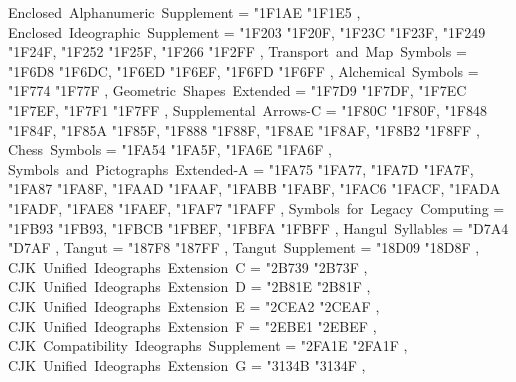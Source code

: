 {    Enclosed~Alphanumeric~Supplement               = { {"1F1AE} {"1F1E5} },
    Enclosed~Ideographic~Supplement                = { {"1F203} {"1F20F}, {"1F23C} {"1F23F}, {"1F249} {"1F24F}, {"1F252} {"1F25F}, {"1F266} {"1F2FF} },
    Transport~and~Map~Symbols                      = { {"1F6D8} {"1F6DC}, {"1F6ED} {"1F6EF}, {"1F6FD} {"1F6FF} },
    Alchemical~Symbols                             = { {"1F774} {"1F77F} },
    Geometric~Shapes~Extended                      = { {"1F7D9} {"1F7DF}, {"1F7EC} {"1F7EF}, {"1F7F1} {"1F7FF} },
    Supplemental~Arrows-C                          = { {"1F80C} {"1F80F}, {"1F848} {"1F84F}, {"1F85A} {"1F85F}, {"1F888} {"1F88F}, {"1F8AE} {"1F8AF}, {"1F8B2} {"1F8FF} },
    Chess~Symbols                                  = { {"1FA54} {"1FA5F}, {"1FA6E} {"1FA6F} },
    Symbols~and~Pictographs~Extended-A             = { {"1FA75} {"1FA77}, {"1FA7D} {"1FA7F}, {"1FA87} {"1FA8F}, {"1FAAD} {"1FAAF}, {"1FABB} {"1FABF}, {"1FAC6} {"1FACF}, {"1FADA} {"1FADF}, {"1FAE8} {"1FAEF}, {"1FAF7} {"1FAFF} },
    Symbols~for~Legacy~Computing                   = { {"1FB93} {"1FB93}, {"1FBCB} {"1FBEF}, {"1FBFA} {"1FBFF} },
    Hangul~Syllables                               = { {"D7A4} {"D7AF} },
    Tangut                                         = { {"187F8} {"187FF} },
    Tangut~Supplement                              = { {"18D09} {"18D8F} },
    CJK~Unified~Ideographs~Extension~C             = { {"2B739} {"2B73F} },
    CJK~Unified~Ideographs~Extension~D             = { {"2B81E} {"2B81F} },
    CJK~Unified~Ideographs~Extension~E             = { {"2CEA2} {"2CEAF} },
    CJK~Unified~Ideographs~Extension~F             = { {"2EBE1} {"2EBEF} },
    CJK~Compatibility~Ideographs~Supplement        = { {"2FA1E} {"2FA1F} },
    CJK~Unified~Ideographs~Extension~G             = { {"3134B} {"3134F} },
  }
